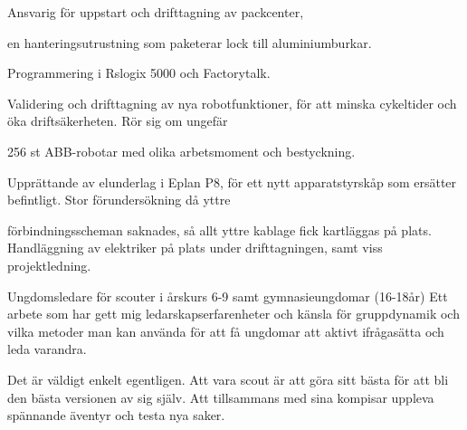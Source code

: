 \documentclass[10pt,a4paper,ragged2e,withhyper]{altacv}
\begin{document}
\begin{paracol}{2}
\divider

Ansvarig för uppstart och drifttagning av packcenter, 

en hanteringsutrustning som paketerar lock till aluminiumburkar. 

Programmering i Rslogix 5000 och
Factorytalk.

\divider
\newpage
{}
Validering och drifttagning av nya robotfunktioner, för att minska cykeltider och
öka driftsäkerheten. Rör sig om ungefär 

256 st ABB-robotar med olika
arbetsmoment och bestyckning.

\divider

Upprättande av elunderlag i Eplan P8, för ett nytt apparatstyrskåp som ersätter
befintligt. Stor förundersökning då yttre


förbindningsscheman saknades, så allt
yttre kablage fick kartläggas på plats. Handläggning av elektriker på plats under
drifttagningen, samt viss projektledning.

\medskip




Ungdomsledare för scouter i årskurs 6-9 samt gymnasieungdomar (16-18år)
Ett arbete som har gett mig ledarskapserfarenheter och känsla för gruppdynamik och vilka metoder man kan använda för att få ungdomar att aktivt ifrågasätta och leda varandra.

\medskip

Det är väldigt enkelt egentligen. Att vara scout är att göra sitt bästa för att bli den bästa versionen av sig själv. Att tillsammans med sina kompisar uppleva spännande äventyr och testa nya saker.


\end{paracol}
\end{document}
